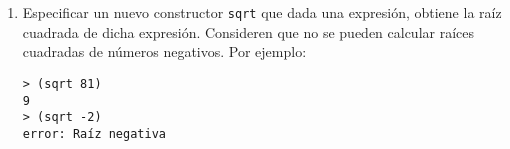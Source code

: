 \documentclass{article}
\begin{document}
\begin{enumerate}
\begin{enumerate}
        \item Especificar un nuevo constructor \texttt{sqrt} que dada una expresión, obtiene la raíz cuadrada de dicha expresión. Consideren que no se pueden calcular raíces cuadradas de números negativos. Por ejemplo:
          \begin{verbatim}
> (sqrt 81)
9
> (sqrt -2)
error: Raíz negativa
          \end{verbatim}
      \end{enumerate}

  \end{enumerate}
\end{document}
